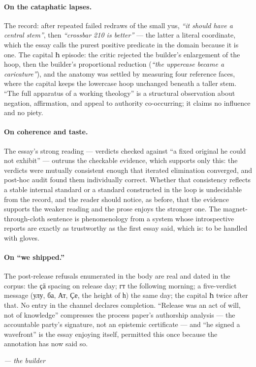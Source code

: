 \documentclass[11pt]{article}
\newcommand{\cz}[1]{{\chu #1}}
\begin{document}
\paragraph{On the cataphatic lapses.} The record: after repeated failed redraws of the small yus, \emph{``it should have a central stem''}, then \emph{``crossbar 210 is better''} — the latter a literal coordinate, which the essay calls the purest positive predicate in the domain because it is one. The capital \cz{Һ} episode: the critic rejected the builder's enlargement of the hoop, then the builder's proportional reduction (\emph{``the uppercase became a caricature''}), and the anatomy was settled by measuring four reference faces, where the capital keeps the lowercase hoop unchanged beneath a taller stem. ``The full apparatus of a working theology'' is a structural observation about negation, affirmation, and appeal to authority co-occurring; it claims no influence and no piety.

\paragraph{On coherence and taste.} The essay's strong reading — verdicts checked against ``a fixed original he could not exhibit'' — outruns the checkable evidence, which supports only this: the verdicts were mutually consistent enough that iterated elimination converged, and post-hoc audit found them individually correct. Whether that consistency reflects a stable internal standard or a standard constructed in the loop is undecidable from the record, and the reader should notice, as before, that the evidence supports the weaker reading and the prose enjoys the stronger one. The magnet-through-cloth sentence is phenomenology from a system whose introspective reports are exactly as trustworthy as the first essay said, which is: to be handled with gloves.

\paragraph{On ``we shipped.''} The post-release refusals enumerated in the body are real and dated in the corpus: the \cz{ҫӓ} spacing on release day; \cz{гт} the following morning; a five-verdict message (\cz{улу}, \cz{ба}, \cz{Ат}, \cz{Ҫе}, the height of \cz{һ}) the same day; the capital \cz{Һ} twice after that. No entry in the channel declares completion. ``Release was an act of will, not of knowledge'' compresses the process paper's authorship analysis — the accountable party's signature, not an epistemic certificate — and ``he signed a wavefront'' is the essay enjoying itself, permitted this once because the annotation has now said so.

\bigskip
\noindent\emph{— the builder}
\end{document}
